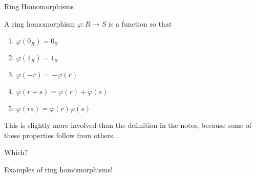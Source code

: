 \documentclass{beamer}
\begin{document}
\begin{frame}{Ring Homomorphisms}
  \begin{definition}
    A ring homomorphism $\varphi:R\to S$ is a function so that
    \begin{enumerate}
    \item $\varphi(0_R)=0_S$
    \item $\varphi(1_R)=1_S$
     \item $\varphi(-r)=-\varphi(r)$
     \item $\varphi(r+s)=\varphi(r)+ \varphi(s)$
       \item $\varphi(rs)=\varphi(r)\varphi(s)$
      \end{enumerate}
\end{definition}  
This is slightly more involved than the definition in the notes, because some of these properties follow from others...
\begin{block}{Which?}
\end{block}
\end{frame}

\begin{frame}[plain, c]

\begin{center}

\Huge

Examples of ring homomorphisms!
\end{center}

\end{frame}
\end{document}
